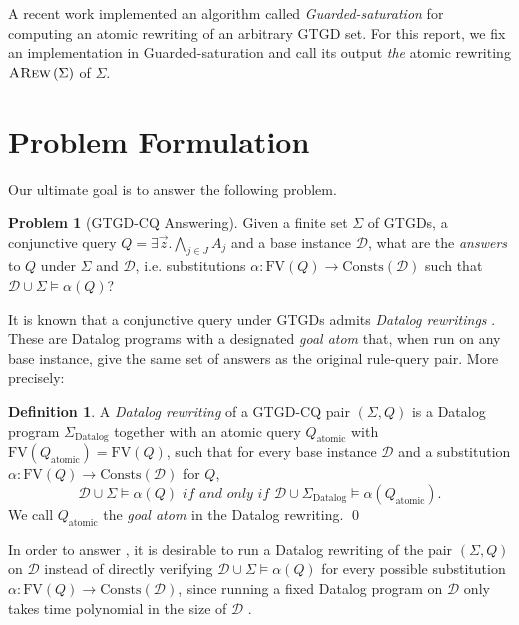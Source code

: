 \documentclass[12pt]{report}
\theoremstyle{plain}
\theoremstyle{definition}
\newtheorem{problem}[theorem]{Problem}
\newtheorem{definition}[theorem]{Definition}
\def\FV{{\mathrm{FV}}}
\def\Consts{{\mathrm{Consts}}}
\newcommand{\ARew}[1]{\ensuremath{\normalfont{\textsc{ARew}} \left( #1 \right)}}
\begin{document}
A recent work \cite{benedikt_buron_germano_kappelmann_motik_2022} implemented an algorithm called \emph{Guarded-saturation} for computing an atomic rewriting of an arbitrary GTGD set. For this report, we fix an implementation in Guarded-saturation and call its output \emph{the} atomic rewriting $\ARew{\Sigma}$ of $\Sigma$.

\section{Problem Formulation}

Our ultimate goal is to answer the following problem.

\begin{problem}[GTGD-CQ Answering]
\label{GTGD-CQ-Answering}
  Given a finite set $\Sigma$ of GTGDs, a conjunctive query $Q = \exists \vec{z}. \bigwedge_{j \in J} A_j$ and a base instance $\mathcal{D}$, what are the \emph{answers} to $Q$ under $\Sigma$ and $\mathcal{D}$, i.e. substitutions $\alpha: \FV(Q) \rightarrow \Consts(\mathcal{D})$ such that $\mathcal{D} \cup \Sigma \models \alpha(Q)$?
\end{problem}

It is known that a conjunctive query under GTGDs admits \emph{Datalog rewritings} \cite{barany_benedikt_cate_2013}. These are Datalog programs with a designated \emph{goal atom} that, when run on any base instance, give the same set of answers as the original rule-query pair. More precisely:

\begin{definition}
  A \emph{Datalog rewriting} of a GTGD-CQ pair $(\Sigma, Q)$ is a Datalog program $\Sigma_\mathrm{Datalog}$ together with an atomic query $Q_\mathrm{atomic}$ with $\FV(Q_\mathrm{atomic}) = \FV(Q)$, such that for every base instance $\mathcal{D}$ and a substitution $\alpha: \FV(Q) \rightarrow \Consts(\mathcal{D})$ for $Q$, $$\mathcal{D} \cup \Sigma \models \alpha(Q) \textit{ if and only if } \mathcal{D} \cup \Sigma_\mathrm{Datalog} \models \alpha(Q_\mathrm{atomic}).$$
  We call $Q_\mathrm{atomic}$ the \emph{goal atom} in the Datalog rewriting.
  \qed
\end{definition}

In order to answer , it is desirable to run a Datalog rewriting of the pair $(\Sigma, Q)$ on $\mathcal{D}$ instead of directly verifying $\mathcal{D} \cup \Sigma \models \alpha(Q)$ for every possible substitution $\alpha: \FV(Q) \rightarrow \Consts(\mathcal{D})$, since running a fixed Datalog program on $\mathcal{D}$ only takes time polynomial in the size of $\mathcal{D}$ \cite{dantsin_eiter_gottlob_voronkov_2001}.
\end{document}
